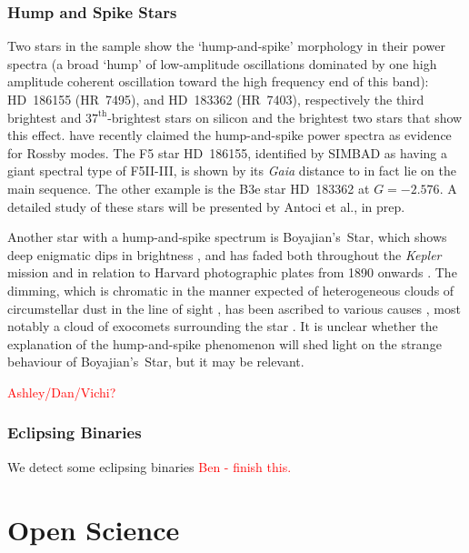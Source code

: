 \documentclass[a4paper,fleqn,usenatbib]{mnras}
\newcommand{\kepler}{\emph{Kepler}\xspace}
\newcommand{\gaia}{\emph{Gaia}\xspace}
\begin{document}
\subsubsection{Hump and Spike Stars}
\label{hs}

Two stars in the sample show the `hump-and-spike' morphology in their power spectra (a broad `hump' of low-amplitude oscillations dominated by one high amplitude coherent oscillation toward the high frequency end of this band): HD~186155 (HR~7495), and HD~183362 (HR~7403), respectively the third brightest and $37^{\text{th}}$-brightest stars on silicon and the brightest two stars that show this effect. \citet{2018MNRAS.474.2774S} have recently claimed the hump-and-spike power spectra as evidence for Rossby modes. The F5 star HD~186155, identified by SIMBAD as having a giant spectral type of F5II-III, is shown by its \gaia distance to in fact lie on the main {}sequence. The other example is the B3e star HD~183362 at $G = -2.576$. A detailed study of these stars will be presented by Antoci et al., in prep.

Another star with a hump-and-spike spectrum is Boyajian's~Star, which shows deep enigmatic dips in brightness \citep{2016MNRAS.457.3988B}, and has faded both throughout the \kepler mission \citep{2016ApJ...830L..39M} and in relation to Harvard photographic plates from 1890 onwards \citep{2016ApJ...822L..34S}. The dimming, which is chromatic in the manner expected of heterogeneous clouds of circumstellar dust in the line of sight \citep{2018ApJ...853..130D,2018arXiv180608842B}, has been ascribed to various causes \citep[reviewed in][]{2018RNAAS...2a..16W}, most notably a cloud of exocomets surrounding the star \citep[e.g.][]{2018MNRAS.473.5286W}. It is unclear whether the explanation of the hump-and-spike phenomenon will shed light on the strange behaviour of Boyajian's~Star, but it may be relevant.

\textcolor{red}{Ashley/Dan/Vichi?}

\subsubsection{Eclipsing Binaries}
\label{ebs}
We detect some eclipsing binaries \textcolor{red}{Ben - finish this.}

\section{Open Science}
\label{open}
\end{document}
